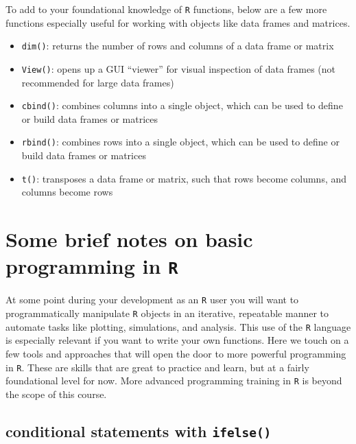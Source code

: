 \documentclass[]{book}
\begin{document}
To add to your foundational knowledge of \texttt{R} functions, below are a few more functions especially useful for working with objects like data frames and matrices.

\begin{itemize}
\item
  \texttt{dim()}: returns the number of rows and columns of a data frame or matrix
\item
  \texttt{View()}: opens up a GUI ``viewer'' for visual inspection of data frames (not recommended for large data frames)
\item
  \texttt{cbind()}: combines columns into a single object, which can be used to define or build data frames or matrices
\item
  \texttt{rbind()}: combines rows into a single object, which can be used to define or build data frames or matrices
\item
  \texttt{t()}: transposes a data frame or matrix, such that rows become columns, and columns become rows
\end{itemize}

\hypertarget{some-brief-notes-on-basic-programming-in-r}{%
\section{\texorpdfstring{Some brief notes on basic programming in \texttt{R}}{Some brief notes on basic programming in R}}\label{some-brief-notes-on-basic-programming-in-r}}

At some point during your development as an \texttt{R} user you will want to programmatically manipulate \texttt{R} objects in an iterative, repeatable manner to automate tasks like plotting, simulations, and analysis. This use of the \texttt{R} language is especially relevant if you want to write your own functions. Here we touch on a few tools and approaches that will open the door to more powerful programming in \texttt{R}. These are skills that are great to practice and learn, but at a fairly foundational level for now. More advanced programming training in \texttt{R} is beyond the scope of this course.

\hypertarget{conditional-statements-with-ifelse}{%
\subsection{\texorpdfstring{conditional statements with \texttt{ifelse()}}{conditional statements with ifelse()}}\label{conditional-statements-with-ifelse}}
\end{document}
